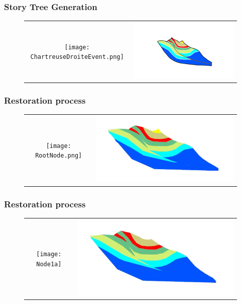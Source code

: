 \documentclass{beamer}
\begin{document}
	\begin{frame}
	\frametitle{Story Tree Generation}
	\begin{figure}[H]
	\centering
	\begin{tabular}{@{}cc@{}}
		\texttt{[image: ChartreuseDroiteEvent.png]}&
	\includegraphics[width=.75\textwidth]{chartreusedroite.png}\\


	\end{tabular}
	\end{figure}
	\end{frame}
	
	\begin{frame}
	\frametitle{Restoration process}
	\begin{figure}[H]
	\centering
	\begin{tabular}{@{}cc@{}}
	\texttt{[image: RootNode.png]}&
	\includegraphics[width=.65\textwidth]{chartreusedroite0.png}\\
	\end{tabular}
	\end{figure}
	\end{frame}
	
	\begin{frame}
	\frametitle{Restoration process}
	\begin{figure}[H]
	\centering
	\begin{tabular}{@{}cc@{}}
	\texttt{[image: Node1a]}&
	\includegraphics[width=.65\textwidth]{chartreusedroite1.png}\\
	\end{tabular}
	\end{figure}
	\end{frame}
	
\end{document}
